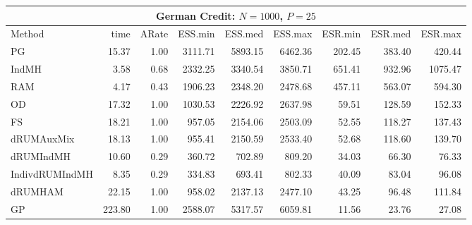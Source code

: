 \begin{table}
\begin{tabular}{l r r r r r r r r } 
\hline
\multicolumn{9}{c}{German Credit: $N = 1000$, $P=25$} \\
\hline
          Method  &     time &    ARate &  ESS.min &  ESS.med &  ESS.max &  ESR.min &  ESR.med &  ESR.max \\ 
              PG  &    15.37 &     1.00 &  3111.71 &  5893.15 &  6462.36 &   202.45 &   383.40 &   420.44 \\ 
           IndMH  &     3.58 &     0.68 &  2332.25 &  3340.54 &  3850.71 &   651.41 &   932.96 &  1075.47 \\ 
             RAM  &     4.17 &     0.43 &  1906.23 &  2348.20 &  2478.68 &   457.11 &   563.07 &   594.30 \\ 
              OD  &    17.32 &     1.00 &  1030.53 &  2226.92 &  2637.98 &    59.51 &   128.59 &   152.33 \\ 
              FS  &    18.21 &     1.00 &   957.05 &  2154.06 &  2503.09 &    52.55 &   118.27 &   137.43 \\ 
      dRUMAuxMix  &    18.13 &     1.00 &   955.41 &  2150.59 &  2533.40 &    52.68 &   118.60 &   139.70 \\ 
       dRUMIndMH  &    10.60 &     0.29 &   360.72 &   702.89 &   809.20 &    34.03 &    66.30 &    76.33 \\ 
  IndivdRUMIndMH  &     8.35 &     0.29 &   334.83 &   693.41 &   802.33 &    40.09 &    83.04 &    96.08 \\ 
         dRUMHAM  &    22.15 &     1.00 &   958.02 &  2137.13 &  2477.10 &    43.25 &    96.48 &   111.84 \\ 
              GP  &   223.80 &     1.00 &  2588.07 &  5317.57 &  6059.81 &    11.56 &    23.76 &    27.08
 \end{tabular}


\end{table}
